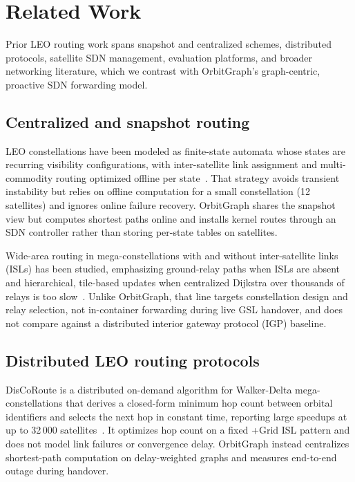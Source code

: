 
\section{Related Work}
\label{sec:related}

Prior LEO routing work spans snapshot and centralized schemes, distributed
protocols, satellite SDN management, evaluation platforms, and broader
networking literature, which we contrast with OrbitGraph's graph-centric,
proactive SDN forwarding model.

\subsection{Centralized and snapshot routing}

LEO constellations have been modeled as finite-state automata whose states are
recurring visibility configurations, with inter-satellite link assignment and
multi-commodity routing optimized offline per
state~\cite{seong:topological-design:1995}.
That strategy avoids transient instability but relies on offline computation for
a small constellation (12 satellites) and ignores online failure recovery.
OrbitGraph shares the snapshot view but computes shortest paths online and
installs kernel routes through an SDN controller rather than storing per-state
tables on satellites.

Wide-area routing in mega-constellations with and without inter-satellite links
(ISLs) has been studied, emphasizing ground-relay paths when ISLs are absent and
hierarchical, tile-based updates when centralized Dijkstra over thousands of
relays is too slow~\cite{handley:ground-relays:2019}.
Unlike OrbitGraph, that line targets constellation design and relay selection,
not in-container forwarding during live GSL handover, and does not compare
against a distributed interior gateway protocol (IGP) baseline.

\subsection{Distributed LEO routing protocols}

DisCoRoute is a distributed on-demand algorithm for Walker-Delta
mega-constellations that derives a closed-form minimum hop count between orbital
identifiers and selects the next hop in constant time, reporting large speedups
at up to 32\,000 satellites~\cite{gregory:satellite-routing:2022}.
It optimizes hop count on a fixed +Grid ISL pattern and does not model link
failures or convergence delay.
OrbitGraph instead centralizes shortest-path computation on delay-weighted
graphs and measures end-to-end outage during handover.


